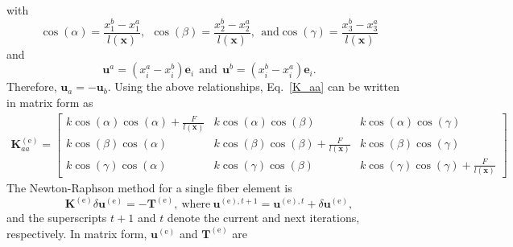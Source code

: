 %
with
%
\begin{equation}
\cos(\alpha) = \frac{x^b_1 - x^a_1}{l(\textbf{x})}, \ \ \cos(\beta) = \frac{x^b_2 - x^a_2}{l(\textbf{x})}, \ \ \text{and} \cos(\gamma) = \frac{x^b_3 - x^a_3}{l(\textbf{x})} 
\end{equation}
%
and 
%
\begin{equation}
\textbf{u}^a = (x^a_i - x^b_i) \textbf{e}_i \ \ \text{and} \ \ \textbf{u}^b = (x^b_i - x^a_i) \textbf{e}_i .
\end{equation}
%
Therefore, $\textbf{u}_a = -\textbf{u}_b$. Using the above relationships, Eq.\ \eqref{K_aa} can be written in matrix form as
%
\begin{eqnarray}
\textbf{K}^{(\text{e})}_{aa} =
\begin{bmatrix}
k \cos(\alpha)\cos(\alpha) + \frac{F}{l(\textbf{x})} & k \cos(\alpha)\cos(\beta) & k \cos(\alpha)\cos(\gamma) \\
k \cos(\beta)\cos(\alpha) & k \cos(\beta)\cos(\beta)+ \frac{F}{l(\textbf{x})}  & k \cos(\beta)\cos(\gamma) \\
k \cos(\gamma)\cos(\alpha) & k \cos(\gamma)\cos(\beta) & k \cos(\gamma)\cos(\gamma) + \frac{F}{l(\textbf{x})} 
\end{bmatrix}
\label{K^e_aa_matrix}
\end{eqnarray}
%
The Newton-Raphson method for a single fiber element is
%
\begin{equation}
\textbf{K}^{(\text{e})} \delta \textbf{u}^{(\text{e})} = - \textbf{T}^{(\text{e})}, \ \text{where} \ \textbf{u}^{(\text{e}),t+1}  = \textbf{u}^{(\text{e}),t} + \delta \textbf{u}^{(\text{e})},
\label{Newton_Raphson}
\end{equation}
%
and the superscripts $t+1$ and $t$ denote the current and next iterations, respectively. In matrix form, $\textbf{u}^{(\text{e})}$ and $\textbf{T}^{(\text{e})}$ are
%
